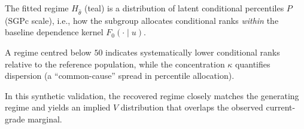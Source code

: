 \documentclass[10pt]{article}
\begin{document}
\noindent
\begin{minipage}[t]{3.75in}
  \vspace{0.15in}
  \hspace{0.12in}%
  \begin{minipage}{3.45in}
    \small\raggedright\color{bodyGrey}

    The fitted regime $H_{\hat\theta}$ (teal) is a distribution of latent 
    conditional percentiles $P$ (SGPc scale), i.e., how the subgroup allocates 
    conditional ranks \emph{within} the baseline dependence kernel $F_0(\cdot\mid u)$.

    \vspace{4pt}
    A regime centred below $50$ indicates systematically lower conditional ranks 
    relative to the reference population, while the concentration $\kappa$ quantifies 
    dispersion (a ``common-cause'' spread in percentile allocation).

    \vspace{4pt}
    In this synthetic validation, the recovered regime closely matches the generating 
    regime and yields an implied $V$ distribution that overlaps the observed current-grade marginal.

  \end{minipage}
  \vspace{0.1in}
\end{minipage}
\end{document}
